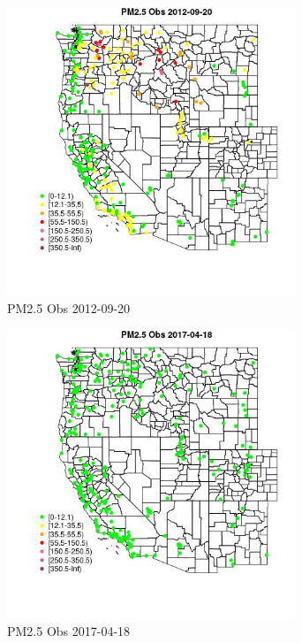 \begin{figure} 
\centering  
\includegraphics[width=0.77\textwidth]{Code_Outputs/Report_ML_input_PM25_Step4_part_e_de_duplicated_aves_compiled_2019-05-14wNAs_MapObsPM25_Obs2012-09-20.jpg} 
\caption{\label{fig:Report_ML_input_PM25_Step4_part_e_de_duplicated_aves_compiled_2019-05-14wNAsMapObsPM25_Obs2012-09-20}PM2.5 Obs 2012-09-20} 
\end{figure} 
 

\begin{figure} 
\centering  
\includegraphics[width=0.77\textwidth]{Code_Outputs/Report_ML_input_PM25_Step4_part_e_de_duplicated_aves_compiled_2019-05-14wNAs_MapObsPM25_Obs2017-04-18.jpg} 
\caption{\label{fig:Report_ML_input_PM25_Step4_part_e_de_duplicated_aves_compiled_2019-05-14wNAsMapObsPM25_Obs2017-04-18}PM2.5 Obs 2017-04-18} 
\end{figure} 
 

